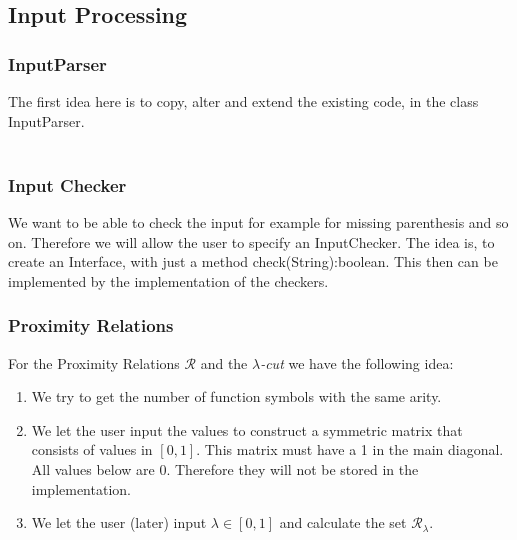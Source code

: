 \documentclass{article}
\begin{document}






\subsection{Input Processing} 
\subsubsection{InputParser}
The first idea here is to copy, alter and extend the existing code, in the class InputParser.
\\ \ \\
\noindent
\subsubsection{Input Checker}
We want to be able to check the input for example for missing parenthesis and so on. Therefore we will allow the user to specify an InputChecker. The idea is, to create an Interface, with just a method check(String):boolean. This then can be implemented by the implementation of the checkers.
\subsubsection{Proximity Relations}
For the Proximity Relations \(\mathcal{R}\) and the \(\lambda\)\textit{-cut} we have the following idea:\\
\begin{enumerate}
	\item We try to get the number of function symbols with the same arity. 
	\item We let the user input the values to construct a symmetric matrix that consists of values in \([0,1]\). This matrix must have a 1 in the main diagonal. All values below are 0. Therefore they will not be stored in the implementation.
	\item We let the user (later) input \(\lambda\in[0,1]\) and calculate the set \(\mathcal{R}_\lambda\).
\end{enumerate}
\end{document}
